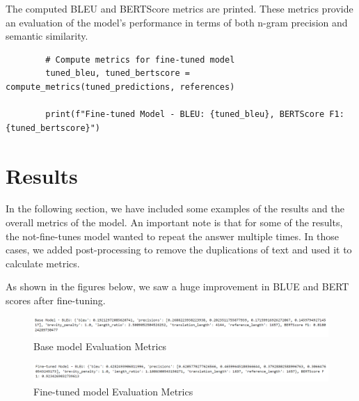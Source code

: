 \documentclass{solutionclass} %
\begin{document}
\begin{solution}
	The computed BLEU and BERTScore metrics are printed. These metrics provide an evaluation of the model’s performance in terms of both n-gram precision and semantic similarity.
	\begin{lstlisting}
		# Compute metrics for fine-tuned model
		tuned_bleu, tuned_bertscore = compute_metrics(tuned_predictions, references)
		
		print(f"Fine-tuned Model - BLEU: {tuned_bleu}, BERTScore F1: {tuned_bertscore}")
	\end{lstlisting}
\end{solution}


\section{Results}

In the following section, we have included some examples of the results and the overall metrics of the model. An important note is that for some of the results, the not-fine-tunes model wanted to repeat the answer multiple times. In those cases, we added post-processing to remove the duplications of text and used it to calculate metrics.

As shown in the figures below, we saw a huge improvement in BLUE and BERT scores after fine-tuning.




\begin{figure}[H]
	\centering
	\includegraphics[width=1.0\textwidth]{img/3/base.png}
		\caption{Base model Evaluation Metrics}
\end{figure}


\begin{figure}[H]
	\centering
	\includegraphics[width=1.0\textwidth]{img/3/ft.png}
	\caption{Fine-tuned model Evaluation Metrics}
\end{figure}
\end{document}
